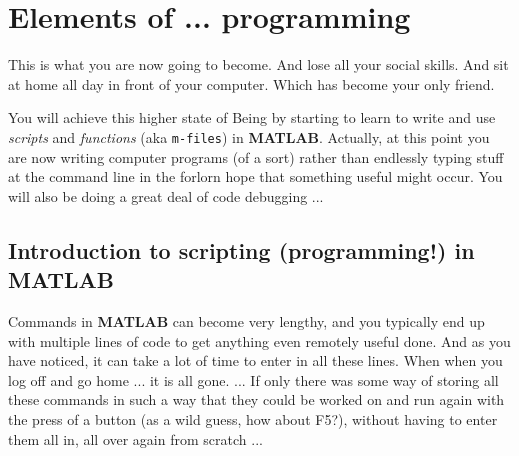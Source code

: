 \documentclass{tufte-book} %
\begin{document}

\chapter{Elements of ... programming}
\label{ch:02}


\begin{fullwidth}

 This is what you are now going to become. And lose all your social skills. And sit at home all day in front of your computer. Which has become your only friend.

You will achieve this higher state of Being by starting to learn to write and use \textit{scripts} and \textit{functions} (aka \texttt{m-files}) in \textbf{MATLAB}. Actually, at this point you are now writing computer programs (of a sort) rather than endlessly typing stuff at the command line in the forlorn hope that something useful might occur.
You will also be doing a great deal of code debugging ...
\end{fullwidth}


\newpage


\section{Introduction to scripting (programming!) in MATLAB}

Commands in \textbf{MATLAB} can become very lengthy, and you typically end up with multiple lines of code to get anything even remotely useful done. And as you have noticed, it can take a lot of time to enter in all these lines. When when you log off and go home ... it is all gone.  ... If only there was some way of storing all these commands in such a way that they could be worked on and run again with the press of a button (as a wild guess, how about \textsf{F5}?), without having to enter them all in, all over again from scratch ...
\end{document}
